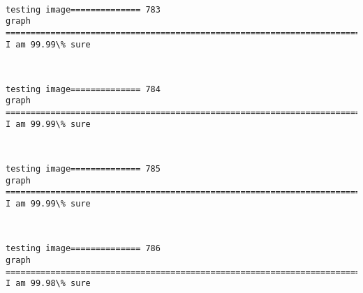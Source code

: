 \documentclass[11pt]{article}
\begin{document}
    \begin{center}
    \end{center}
    { \hspace*{\fill} \\}
    
    \begin{Verbatim}[commandchars=\\\{\}]
testing image============== 783
graph
============================================================================
I am 99.99\% sure

    \end{Verbatim}

    \begin{center}
    \end{center}
    { \hspace*{\fill} \\}
    
    \begin{Verbatim}[commandchars=\\\{\}]
testing image============== 784
graph
============================================================================
I am 99.99\% sure

    \end{Verbatim}

    \begin{center}
    \end{center}
    { \hspace*{\fill} \\}
    
    \begin{Verbatim}[commandchars=\\\{\}]
testing image============== 785
graph
============================================================================
I am 99.99\% sure

    \end{Verbatim}

    \begin{center}
    \end{center}
    { \hspace*{\fill} \\}
    
    \begin{Verbatim}[commandchars=\\\{\}]
testing image============== 786
graph
============================================================================
I am 99.98\% sure

    \end{Verbatim}
\end{document}

